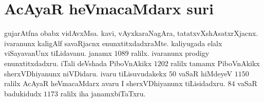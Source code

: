 \section*{AcAyaR heVmacaMdarx suri}
gujarAtfna obabx vidAvxMsa. kavi, vAyxkaraNagAra, tatatxvXshAsatxrXjacnx. ivaranunx kaligAlf savaRjacnx enunxtitxdadxraMte. kaliyugada elalx viSayavanUnx tiLidavanu. janamx $1089$ ralilx. ivaranunx {\rm prodigy} enunxtitxdadxru. iTali deVshada PiboVnAkikx $1202$ ralilx  tamamx PiboVnAkikx sherxVDhiyanunx niVDidaru. ivaru tiLisuvudakekx $50$ vaSaR hiMdeyeV $1150$ ralilx AcAyaR heVmacaMdarx avaru I sherxVDhiyanunx tiLisidadxru. $84$ vaSaR badukidudx $1173$ ralilx iha janamxbiTaTxru.
